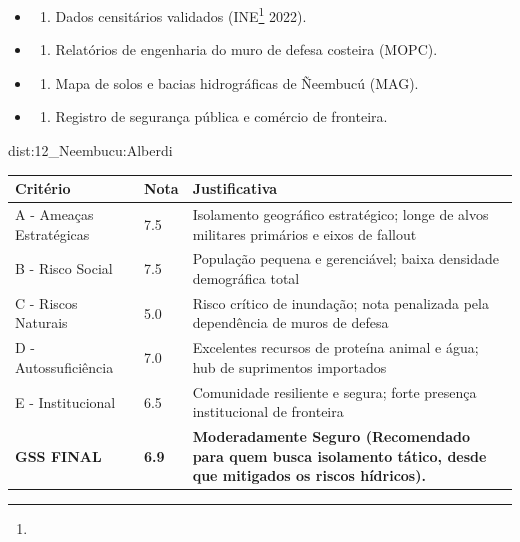 {\begin{itemize}
\tightlist
\item
  \begin{enumerate}
  \def\labelenumi{\arabic{enumi})}
  \tightlist
  \item
    Dados censitários validados (INE\footnote{\fineINE} 2022).
  \end{enumerate}
\item
  \begin{enumerate}
  \def\labelenumi{\arabic{enumi})}
  \setcounter{enumi}{1}
  \tightlist
  \item
    Relatórios de engenharia do muro de defesa costeira (MOPC).
  \end{enumerate}
\item
  \begin{enumerate}
  \def\labelenumi{\arabic{enumi})}
  \setcounter{enumi}{2}
  \tightlist
  \item
    Mapa de solos e bacias hidrográficas de Ñeembucú (MAG).
  \end{enumerate}
\item
  \begin{enumerate}
  \def\labelenumi{\arabic{enumi})}
  \setcounter{enumi}{3}
  \tightlist
  \item
    Registro de segurança pública e comércio de fronteira.
  \end{enumerate}
\end{itemize}}{dist:12_Neembucu:Alberdi}
\begin{table}[ht!]
\small \begin{tabular}{p{3.0cm}p{0.8cm}p{6.0cm}} \toprule
\textbf{Critério} & \textbf{Nota} & \textbf{Justificativa} \\ \midrule
A - Ameaças Estratégicas & 7.5 & Isolamento geográfico estratégico; longe de alvos militares primários e eixos de fallout \\
B - Risco Social & 7.5 & População pequena e gerenciável; baixa densidade demográfica total \\
C - Riscos Naturais & 5.0 & Risco crítico de inundação; nota penalizada pela dependência de muros de defesa \\
D - Autossuficiência & 7.0 & Excelentes recursos de proteína animal e água; hub de suprimentos importados \\
E - Institucional & 6.5 & Comunidade resiliente e segura; forte presença institucional de fronteira \\
\midrule \textbf{GSS FINAL} & \textbf{6.9} & \textbf{Moderadamente Seguro (Recomendado para quem busca isolamento tático, desde que mitigados os riscos hídricos).} \\ \bottomrule \end{tabular}
\end{table}
